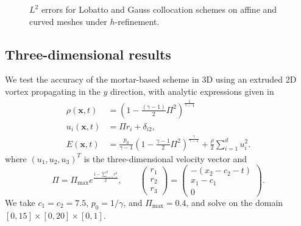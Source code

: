 \documentclass{svjour3}                     %
\newcommand{\LRp}[1]{\left( #1 \right)}
\begin{document}
\begin{figure}
{
}
\caption{$L^2$ errors for Lobatto and Gauss collocation schemes on affine and curved meshes under $h$-refinement. }
\label{fig:2d}
\end{figure}


\subsection{Three-dimensional results}

We test the accuracy of the mortar-based scheme in 3D using an extruded 2D vortex propagating in the $y$ direction, with analytic expressions given in \cite{williams2013nodal}
\begin{align*}
\rho(\bm{x},t) &= \LRp{1-\frac{(\gamma-1)}{2}\Pi^2}^{\frac{1}{\gamma-1}}\\
u_i(\bm{x},t) &= \Pi r_i + \delta_{i2}, \\
E(\bm{x},t) &= \frac{p_0}{\gamma-1}\LRp{1-\frac{\gamma-1}{2}\Pi^2}^{\frac{\gamma}{\gamma-1}} + \frac{\rho}{2}\sum_{i=1}^d u_i^2.
\end{align*}
where $(u_1,u_2,u_3)^T$ is the three-dimensional velocity vector and %
\[
\Pi = \Pi_{\max}e^{\frac{1-\sum_{i=1}^dr_i^2}{2}}, \qquad \begin{pmatrix}r_1\\r_2\\r_3\end{pmatrix} = \begin{pmatrix}
-(x_2-c_2-t)\\
x_1-c_1\\
0
\end{pmatrix}.
\]
We take {$c_1 = c_2 = 7.5$}, $p_0 = {1}/{\gamma}$, and $\Pi_{\max} = 0.4$, and solve on the domain $[0,15]\times [0,20]\times [0,1]$.
\end{document}
